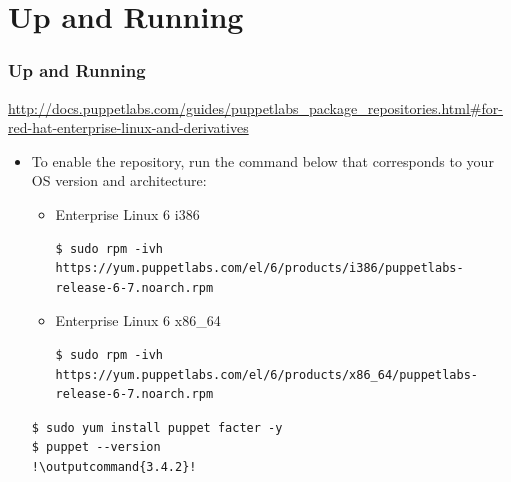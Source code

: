 \documentclass{beamer}
\newcommand{\outputcommand}[1]{\color{darkgreen}{#1}}
\begin{document}
\section{Up and Running}
\begin{frame}
\frametitle{Up and Running}
\url{http://docs.puppetlabs.com/guides/puppetlabs_package_repositories.html#for-red-hat-enterprise-linux-and-derivatives}

\begin{itemize}
\item To enable the repository, run the command below that corresponds to your OS version and architecture:
\begin{itemize}
 \item Enterprise Linux 6 i386

\lstset{language=shell}
\begin{lstlisting}[escapechar=!]
$ sudo rpm -ivh https://yum.puppetlabs.com/el/6/products/i386/puppetlabs-release-6-7.noarch.rpm
\end{lstlisting}

\item Enterprise Linux 6 x86\_64
\lstset{language=shell}
\begin{lstlisting}[escapechar=!]
$ sudo rpm -ivh https://yum.puppetlabs.com/el/6/products/x86_64/puppetlabs-release-6-7.noarch.rpm
\end{lstlisting}
\end{itemize}
\lstset{language=shell}
\begin{lstlisting}[escapechar=!]
$ sudo yum install puppet facter -y
$ puppet --version
!\outputcommand{3.4.2}!
\end{lstlisting}
\end{itemize}
\end{frame}
\end{document}

